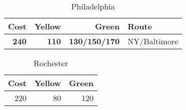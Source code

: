 \documentclass[a4paper,twocolumn]{article}
\begin{document}
\begin{table}[h]
	\centering
	\caption{Philadelphia}
	\begin{tabular}{r|r|r|l}
		Cost & Yellow & Green & Route \\ \hline
		\textbf{240} & \textbf{110} & \textbf{130/150/170} & NY/Baltimore
	\end{tabular}
\end{table}

\begin{table}[h]
	\centering
	\caption{Rochester}
	\begin{tabular}{r|r|r}
		Cost & Yellow & Green \\ \hline
		220 & 80 & 120
	\end{tabular}
\end{table}
\end{document}
